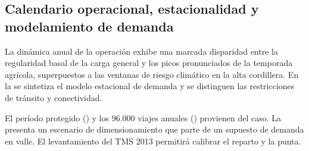 \subsection{Calendario operacional, estacionalidad y modelamiento de demanda}\label{sec:2-estacionalidad}

La dinámica anual de la operación exhibe una marcada disparidad entre la regularidad basal de la carga general y los picos pronunciados de la temporada agrícola, superpuestos a las ventanas de riesgo climático en la alta cordillera. En la  se sintetiza el modelo estacional de demanda y se distinguen las restricciones de tránsito y conectividad.


El período protegido () y los 96.000 viajes anuales () provienen del caso. La  presenta un escenario de dimensionamiento que parte de un supuesto de demanda en valle. El levantamiento del TMS 2013 permitirá calibrar el reparto y la punta.

